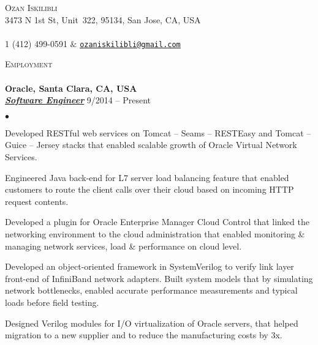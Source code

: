 \documentclass[11pt]{article}
\newcommand{\lineunder}{\vspace*{-8pt} \\ \hspace*{-18pt} \hrulefill \\}
\newcommand{\header}[1]{{\hspace*{-15pt}\vspace*{6pt} \textsc{#1}} \vspace*{-6pt} \lineunder}
\newcommand{\employer}[3]{{ \textbf{#1} \\ \underline{\textbf{\emph{#3}}} \hfill  #2\\  }}
\newcommand{\contact}[3]{
\vspace*{-8pt}
\begin{center}
{\LARGE \scshape {#1}}\\ \vspace*{4pt}
#2 \lineunder 
#3
\end{center}
\vspace*{-8pt}
}
\newenvironment{achievements}{\begin{list}{$\bullet$}{\topsep 0pt \itemsep -2pt}}{\vspace*{4pt}\end{list}}
\providecommand*\emaillink[1]{\nolinkurl{#1}}
\providecommand*\email[1]{\href{mailto:#1}{\emaillink{#1}}}
\begin{document}
\small
\smallskip
\vspace*{-44pt}

\contact{Ozan Iskilibli}
{3473 N 1st St, Unit~322, 95134, San Jose, CA, USA}
{1 (412) 499-0591 $\&$ \email{ozaniskilibli@gmail.com}}


\vspace*{5pt}






\vspace*{5pt}




\header{Employment}

\employer{Oracle, Santa Clara, CA, USA}{9/2014 -- Present}{Software Engineer}
	\begin{achievements}
    	\item Developed RESTful web services on Tomcat -- Seams -- RESTEasy and Tomcat -- Guice -- Jersey stacks that enabled scalable growth of Oracle Virtual Network Services.
		\item Engineered Java back-end for L7 server load balancing feature that enabled customers to route the client calls over their cloud based on incoming HTTP request contents.
		\item Developed a plugin for Oracle Enterprise Manager Cloud Control that linked the networking environment to the cloud administration that enabled monitoring \& managing network services, load \& performance on cloud level.
	\item Developed an object-oriented framework in SystemVerilog to verify link layer front-end of InfiniBand network adapters. Built system models that by simulating network bottlenecks, enabled accurate performance measurements and typical loads before field testing.
	\item Designed Verilog modules for I/O virtualization of Oracle servers, that helped migration to a new supplier and to reduce the manufacturing costs by 3x.
	\end{achievements}
\end{document}
